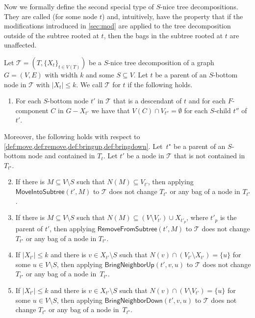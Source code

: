 \documentclass[a4paper,UKenglish,cleveref, autoref, thm-restate, numberwithinsect]{lipics-v2021}
\newcounter{modification}
\newcommand{\slim}{\text{slim}\xspace}
\newcommand{\topheavy}{\text{top-heavy}\xspace}
\newcommand{\MoveIntoSubtree}{\mathsf{MoveIntoSubtree}}
\newcommand{\RemoveFromSubtree}{\mathsf{RemoveFromSubtree}}
\newcommand{\BringNeighborUp}{\mathsf{BringNeighborUp}}
\newcommand{\BringNeighborDown}{\mathsf{BringNeighborDown}}
\begin{document}
Now we formally define the second special type of $S$-nice tree decompositions. They are called \emph{\topheavy} (for some node $t$) and, intuitively, have the property that if the modifications introduced in \cref{sec:mod} are applied to the tree decomposition outside of the subtree rooted at $t$, then the bags in the subtree rooted at $t$ are unaffected. 

\begin{definition}\label{def:topheavy}
Let $\mathcal{T}=(T,\{X_t\}_{t\in V(T)})$ be a \slim $S$-nice tree decomposition of a graph $G=(V,E)$ with width $k$ and some $S\subseteq V$. Let $t$ be a parent of an $S$-bottom node in $\mathcal{T}$ with $|X_t|\le k$.
We call $\mathcal{T}$ \emph{\topheavy} for $t$ if the following holds.
\begin{enumerate}
\item For each $S$-bottom node $t'$ in $\mathcal{T}$ that is a descendant of $t$ and for each $F$-component $C$ in $G-X_{t'}$ we have that $V(C)\cap V_{t''}=\emptyset$ for each $S$-child $t''$ of $t'$.
\end{enumerate}
Moreover, the following holds with respect to \cref{def:move,def:remove,def:bringup,def:bringdown}.  
Let~${t^\star}$ be a parent of an $S$-bottom node and contained in $T_t$.
Let $t'$ be a node in $\mathcal{T}$ that is not contained in $T_{t^\star}$.
\begin{enumerate}\setcounter{enumi}{1}
\item If there is $M\subseteq V\setminus S$ such that $N(M)\subseteq V_{t'}$, then applying $\MoveIntoSubtree(t', M)$ to $\mathcal{T}$ does not change $T_{t^\star}$ or any bag of a node in $T_{t^\star}$.
\item If there is $M\subseteq V\setminus S$ such that $N(M)\subseteq (V\setminus V_{t'})\cup X_{t'_p}$, where $t'_p$ is the parent of $t'$, then applying $\RemoveFromSubtree(t', M)$ to $\mathcal{T}$ does not change $T_{t^\star}$ or any bag of a node in $T_{t^\star}$.
\item If $|X_{t'}|\le k$ and there is $v\in X_{t'}\setminus S$ such that $N(v)\cap (V_{t'}\setminus X_{t'})=\{u\}$ for some $u\in V\setminus S$, then applying $\BringNeighborUp(t', v, u)$ to $\mathcal{T}$ does not change $T_{t^\star}$ or any bag of a node in~$T_{t^\star}$.
\item If $|X_{t'}|\le k$ and there is $v\in X_{t'}\setminus S$ such that $N(v)\cap (V\setminus V_{t'})=\{u\}$ for some $u\in V\setminus S$, then applying $\BringNeighborDown(t', v, u)$ to $\mathcal{T}$ does not change $T_{t^\star}$ or any bag of a node in~$T_{t^\star}$.
\end{enumerate}
\end{definition}
\end{document}
